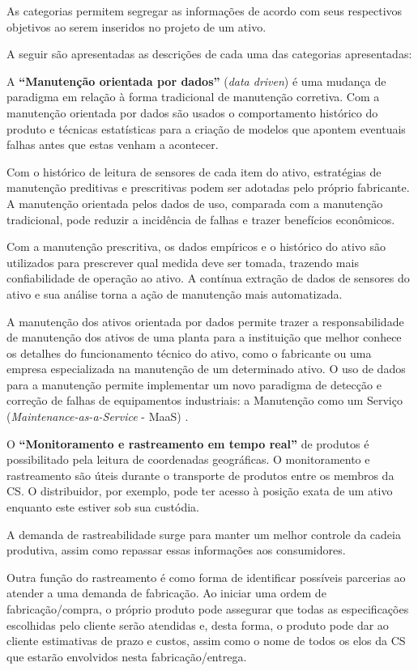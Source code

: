 As categorias permitem segregar as informações de acordo com seus respectivos objetivos ao serem inseridos no projeto de um ativo.

A seguir são apresentadas as descrições de cada uma das categorias apresentadas:

A \textbf{``Manutenção orientada por dados''} (\textit{data driven}) é uma mudança de paradigma em relação à forma tradicional de manutenção corretiva. Com a manutenção orientada por dados são usados o comportamento histórico do produto e técnicas estatísticas para a criação de modelos que apontem eventuais falhas antes que estas venham a acontecer.

Com o histórico de leitura de sensores de cada item do ativo, estratégias de manutenção preditivas e prescritivas podem ser adotadas pelo próprio fabricante. A manutenção orientada pelos dados de uso, comparada com a manutenção tradicional, pode reduzir a incidência de falhas e trazer benefícios econômicos.

Com a manutenção prescritiva, os dados empíricos e o histórico do ativo são utilizados para prescrever qual medida deve ser tomada, trazendo mais confiabilidade de operação ao ativo. A contínua extração de dados de sensores do ativo e sua análise torna a ação de manutenção mais automatizada.

A manutenção dos ativos orientada por dados permite trazer a responsabilidade de manutenção dos ativos de uma planta para a instituição que melhor conhece os detalhes do funcionamento técnico do ativo, como o fabricante ou uma empresa especializada na manutenção de um determinado ativo. O uso de dados para a manutenção permite implementar um novo paradigma de detecção e correção de falhas de equipamentos industriais: a Manutenção como um Serviço (\textit{Maintenance-as-a-Service} - MaaS) \cite{zoll2018maas}.

O \textbf{``Monitoramento e rastreamento em tempo real''} de produtos é possibilitado pela leitura de coordenadas geográficas. O monitoramento e rastreamento são úteis durante o transporte de produtos entre os membros da CS. O distribuidor, por exemplo, pode ter acesso à posição exata de um ativo enquanto este estiver sob sua custódia.

A demanda de rastreabilidade surge para manter um melhor controle da cadeia produtiva, assim como repassar essas informações aos consumidores.

Outra função do rastreamento é como forma de identificar possíveis parcerias ao atender a uma demanda de fabricação. Ao iniciar uma ordem de fabricação/compra, o próprio produto pode assegurar que todas as especificações escolhidas pelo cliente serão atendidas e, desta forma, o produto pode dar ao cliente estimativas de prazo e custos, assim como o nome de todos os elos da CS que estarão envolvidos nesta fabricação/entrega.

